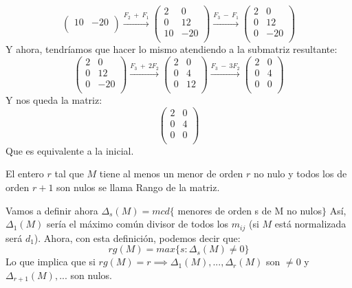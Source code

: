 \begin{ejemplo}
\[\begin{pmatrix}
 10 & -20\\
\end{pmatrix}\xrightarrow{F_2\ +\ F_1}
\begin{pmatrix}
 2 & 0 \\
 0 & 12\\
 10 & -20\\
\end{pmatrix} \xrightarrow{F_3\ -\ F_1}
\begin{pmatrix}
 2 & 0 \\
 0 & 12\\
 0 & -20\\
\end{pmatrix}
	\]
	Y ahora, tendríamos que hacer lo mismo atendiendo a la submatriz resultante:
	\[
	\begin{pmatrix}
 2 & 0 \\
 0 & 12 \\
 0 & -20 \\
\end{pmatrix}\xrightarrow{F_3\ +\ 2F_2}
\begin{pmatrix}
  2 & 0 \\
  0 & 4 \\
  0 & 12 \\
\end{pmatrix}\xrightarrow{F_3\ -\ 3F_2}
\begin{pmatrix}
  2 & 0 \\
  0 & 4 \\
  0 & 0 \\
\end{pmatrix}
	\]
	Y nos queda la matriz:
	\[
	\begin{pmatrix}
 2 & 0 \\
 0 & 4\\
 0 & 0\\
\end{pmatrix}
	\]
	Que es equivalente a la inicial.
\end{ejemplo}

\begin{ndef}
	El entero $r$ tal que $M$ tiene al menos un menor de orden $r$ no nulo y todos los de orden $r+1$ son nulos se llama Rango de la matriz.
\end{ndef}

Vamos a definir ahora $\Delta_s(M) = mcd\{$ menores de orden s de M no nulos$\}$
Así, $\Delta_1(M)$ sería el máximo común divisor de todos los $m_{ij}$ (si $M$ está normalizada será $d_1$). Ahora, con esta definición, podemos decir que:
\[
rg(M) = max\{s : \Delta_s(M) \ne 0\}
\]
Lo que implica que si $rg(M) = r \implies \Delta_1(M),...,\Delta_r(M)$ son $\ne 0$ y $\Delta_{r+1}(M),...$ son nulos.

